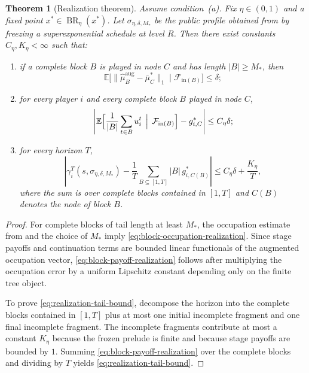\documentclass[12pt]{article}
\newtheorem{theorem}{Theorem}[section]
\theoremstyle{definition}
\newcommand{\E}{\mathbb{E}}
\newcommand{\1}{\mathbf{1}}
\newcommand{\cF}{\mathcal{F}}
\DeclareMathOperator{\BR}{BR}
\begin{document}
\begin{theorem}[Realization theorem]
\label{thm:realization}
Assume condition~\textnormal{(a)}.  Fix $\eta\in(0,1)$ and a fixed point $x^*\in\BR_\eta(x^*)$.  Let
$\sigma_{\eta,\delta,M_*}$ be the public profile obtained from
 by freezing a superexponential schedule at level $R$.
Then there exist constants $C_\eta,K_\eta<\infty$ such that:
\begin{enumerate}[label=\textnormal{(Q\arabic*)},leftmargin=2.8em]
\item if a complete block $B$ is played in node $C$ and has length $|B|\ge M_*$,
then
\begin{equation}
\label{eq:block-occupation-realization}
\E\bigl[\|\widehat\mu_B^{\mathrm{aug}}-\bar\mu_C^*\|_1\mid \cF_{\mathrm{in}(B)}\bigr]
\le \delta;
\end{equation}
\item for every player $i$ and every complete block $B$ played in node $C$,
\begin{equation}
\label{eq:block-payoff-realization}
\left|
\E\Bigl[\frac1{|B|}\sum_{t\in B}u_i^t\,
\Bigm|\,\cF_{\mathrm{in}(B)}\Bigr]-g_{i,C}^*
\right|
\le C_\eta\delta;
\end{equation}
\item for every horizon $T$,
\begin{equation}
\label{eq:realization-tail-bound}
\left|
\gamma_i^T(s,\sigma_{\eta,\delta,M_*})
-
\frac1T\sum_{B\subseteq [1,T]} |B|\,g_{i,C(B)}^*
\right|
\le C_\eta\delta + \frac{K_\eta}{T},
\end{equation}
where the sum is over complete blocks contained in $[1,T]$ and $C(B)$ denotes the
node of block $B$.
\end{enumerate}
\end{theorem}

\begin{proof}
For complete blocks of tail length at least $M_*$, the occupation estimate from
 and the choice of $M_*$ imply
\eqref{eq:block-occupation-realization}.  Since stage payoffs and continuation
terms are bounded linear functionals of the augmented occupation vector,
\eqref{eq:block-payoff-realization} follows after multiplying the occupation error
by a uniform Lipschitz constant depending only on the finite tree object.

To prove \eqref{eq:realization-tail-bound}, decompose the horizon into the complete
blocks contained in $[1,T]$ plus at most one initial incomplete fragment and one
final incomplete fragment.  The incomplete fragments contribute at most a constant
$K_\eta$ because the frozen prelude is finite and because stage payoffs are bounded
by $1$.  Summing \eqref{eq:block-payoff-realization} over the complete blocks and
dividing by $T$ yields \eqref{eq:realization-tail-bound}.
\end{proof}
\end{document}
